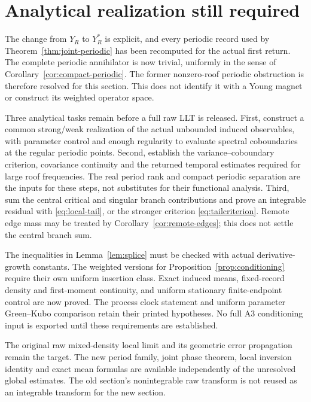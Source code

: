 \section{Analytical realization still required}
The change from $Y_R$ to $Y_R^*$ is explicit, and every periodic record used
by Theorem~\ref{thm:joint-periodic} has been recomputed for the actual first
return. The complete periodic annihilator is now trivial, uniformly in the
sense of Corollary~\ref{cor:compact-periodic}. The former nonzero-roof
periodic obstruction is therefore resolved for this section. This does not
identify it with a Young magnet or construct its weighted operator space.

Three analytical tasks remain before a full raw LLT is released. First,
construct a common strong/weak realization of the actual unbounded induced
observables, with parameter control and enough regularity to evaluate
spectral coboundaries at the regular periodic points. Second, establish
the variance--coboundary criterion, covariance continuity and the returned
temporal estimates required for large roof frequencies. The real period
rank and compact periodic separation are the inputs for these steps, not
substitutes for their functional analysis. Third, sum the central critical
and singular branch contributions and prove an integrable residual with
\eqref{eq:local-tail}, or the stronger criterion \eqref{eq:tailcriterion}.
Remote edge mass may be treated by Corollary~\ref{cor:remote-edges}; this
does not settle the central branch sum.

The inequalities in Lemma~\ref{lem:splice} must be checked with actual
derivative-growth constants. The weighted versions for
Proposition~\ref{prop:conditioning} require their own uniform insertion
class. Exact induced means, fixed-record density and first-moment continuity,
and uniform stationary finite-endpoint control are now proved. The
process clock statement and uniform parameter Green--Kubo comparison
retain their printed hypotheses. No full A3
conditioning input is exported until these requirements are established.

The original raw mixed-density local limit and its geometric error
propagation remain the target. The new period family, joint phase theorem,
local inversion identity and exact mean formulas are available independently
of the unresolved global estimates. The old section's nonintegrable raw
transform is not reused as an integrable transform for the new section.

